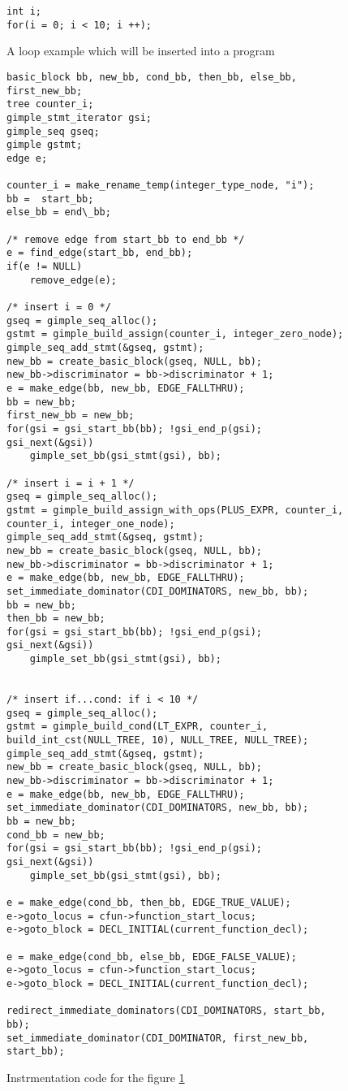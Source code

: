 \documentclass[11pt]{article}
\begin{document}
\begin{figure}
\begin{lstlisting}
int i;
for(i = 0; i < 10; i ++);
\end{lstlisting}
\caption{A loop example which will be inserted into a program}
\label{fig:origin-loop-example}
\end{figure}

\begin{figure}
\begin{lstlisting}
basic_block bb, new_bb, cond_bb, then_bb, else_bb, first_new_bb;
tree counter_i;
gimple_stmt_iterator gsi;
gimple_seq gseq;
gimple gstmt;
edge e;

counter_i = make_rename_temp(integer_type_node, "i");
bb =  start_bb;
else_bb = end\_bb;

/* remove edge from start_bb to end_bb */
e = find_edge(start_bb, end_bb);
if(e != NULL)
    remove_edge(e);

/* insert i = 0 */
gseq = gimple_seq_alloc();
gstmt = gimple_build_assign(counter_i, integer_zero_node);
gimple_seq_add_stmt(&gseq, gstmt);
new_bb = create_basic_block(gseq, NULL, bb);
new_bb->discriminator = bb->discriminator + 1;
e = make_edge(bb, new_bb, EDGE_FALLTHRU);
bb = new_bb;
first_new_bb = new_bb;
for(gsi = gsi_start_bb(bb); !gsi_end_p(gsi); gsi_next(&gsi))
    gimple_set_bb(gsi_stmt(gsi), bb);

/* insert i = i + 1 */
gseq = gimple_seq_alloc();
gstmt = gimple_build_assign_with_ops(PLUS_EXPR, counter_i, counter_i, integer_one_node);
gimple_seq_add_stmt(&gseq, gstmt);
new_bb = create_basic_block(gseq, NULL, bb);
new_bb->discriminator = bb->discriminator + 1;
e = make_edge(bb, new_bb, EDGE_FALLTHRU);
set_immediate_dominator(CDI_DOMINATORS, new_bb, bb);
bb = new_bb;
then_bb = new_bb;
for(gsi = gsi_start_bb(bb); !gsi_end_p(gsi); gsi_next(&gsi))
    gimple_set_bb(gsi_stmt(gsi), bb);


/* insert if...cond: if i < 10 */
gseq = gimple_seq_alloc();
gstmt = gimple_build_cond(LT_EXPR, counter_i, build_int_cst(NULL_TREE, 10), NULL_TREE, NULL_TREE);
gimple_seq_add_stmt(&gseq, gstmt);
new_bb = create_basic_block(gseq, NULL, bb);
new_bb->discriminator = bb->discriminator + 1;
e = make_edge(bb, new_bb, EDGE_FALLTHRU);
set_immediate_dominator(CDI_DOMINATORS, new_bb, bb);
bb = new_bb;
cond_bb = new_bb;
for(gsi = gsi_start_bb(bb); !gsi_end_p(gsi); gsi_next(&gsi))
    gimple_set_bb(gsi_stmt(gsi), bb);

e = make_edge(cond_bb, then_bb, EDGE_TRUE_VALUE);
e->goto_locus = cfun->function_start_locus;
e->goto_block = DECL_INITIAL(current_function_decl);

e = make_edge(cond_bb, else_bb, EDGE_FALSE_VALUE);
e->goto_locus = cfun->function_start_locus;
e->goto_block = DECL_INITIAL(current_function_decl);

redirect_immediate_dominators(CDI_DOMINATORS, start_bb, bb);
set_immediate_dominator(CDI_DOMINATOR, first_new_bb, start_bb);

\end{lstlisting}
\caption{Instrmentation code for the figure \ref{fig:origin-loop-example}}
\label{fig:instrument-loop-example}
\end{figure}
\end{document}
